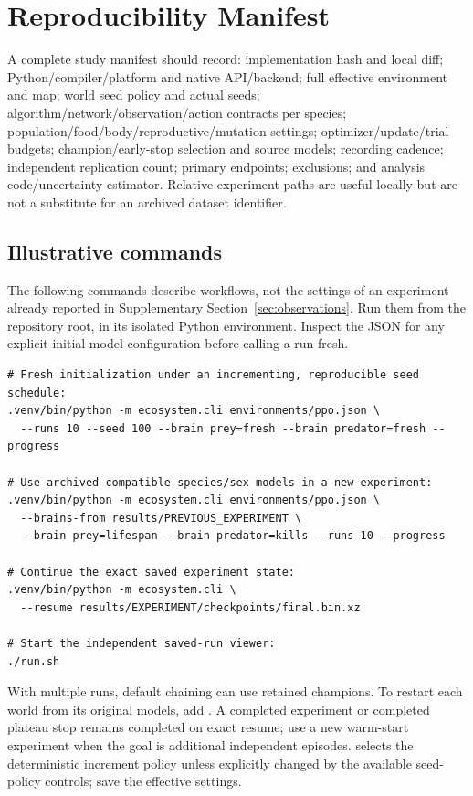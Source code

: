 \section{Reproducibility Manifest}\label{app:manifest}
A complete study manifest should record: implementation hash and local diff;
Python/compiler/platform and native API/backend; full effective environment and
map; world seed policy and actual seeds; algorithm/network/observation/action
contracts per species; population/food/body/reproductive/mutation settings;
optimizer/update/trial budgets; champion/early-stop selection and source models;
recording cadence; independent replication count; primary endpoints; exclusions;
and analysis code/uncertainty estimator. Relative experiment paths are useful
locally but are not a substitute for an archived dataset identifier.

\subsection{Illustrative commands}
The following commands describe workflows, not the settings of an experiment
already reported in Supplementary Section~\ref{sec:observations}. Run them from the repository
root, in its isolated Python environment. Inspect the JSON for any explicit
initial-model configuration before calling a run fresh.
\begin{lstlisting}
# Fresh initialization under an incrementing, reproducible seed schedule:
.venv/bin/python -m ecosystem.cli environments/ppo.json \
  --runs 10 --seed 100 --brain prey=fresh --brain predator=fresh --progress

# Use archived compatible species/sex models in a new experiment:
.venv/bin/python -m ecosystem.cli environments/ppo.json \
  --brains-from results/PREVIOUS_EXPERIMENT \
  --brain prey=lifespan --brain predator=kills --runs 10 --progress

# Continue the exact saved experiment state:
.venv/bin/python -m ecosystem.cli \
  --resume results/EXPERIMENT/checkpoints/final.bin.xz

# Start the independent saved-run viewer:
./run.sh
\end{lstlisting}
With multiple runs, default chaining can use retained champions. To restart each
world from its original models, add . A completed
experiment or completed plateau stop remains completed on exact resume; use a
new warm-start experiment when the goal is additional independent episodes.
\code{--seed} selects the deterministic increment policy unless explicitly
changed by the available seed-policy controls; save the effective settings.

